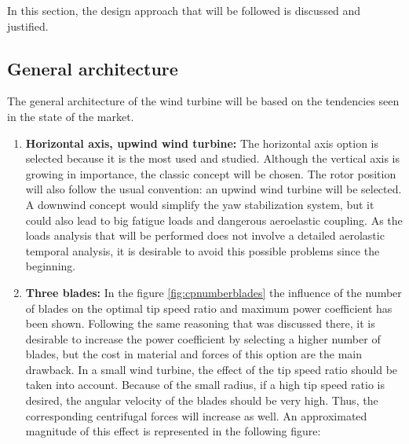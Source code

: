 \documentclass[../TFG_Report.tex]{subfiles}
\begin{document}
	
	In this section, the design approach that will be followed is discussed and justified. 

\subsection{General architecture}

The general architecture of the wind turbine will be based on the tendencies seen in the state of the market. \\

\begin{enumerate}


\item \textbf{Horizontal axis, upwind wind turbine:} The horizontal axis option is selected because it is the most used and studied. Although the vertical axis is growing in importance, the classic concept will be chosen. The rotor position will also follow the usual convention: an upwind wind turbine will be selected. A downwind concept would simplify the yaw stabilization system, but it could also lead to big fatigue loads and dangerous aeroelastic coupling. As the loads analysis that will be performed does not involve a detailed aerolastic temporal analysis, it is desirable to avoid this possible problems since the beginning. \\

\item  \textbf{Three blades:} In the figure \ref{fig:cpnumberblades} the influence of the number of blades on the optimal tip speed ratio and maximum power coefficient has been shown. Following the same reasoning that was discussed there, it is desirable to increase the power coefficient by selecting a higher number of blades, but the cost in material and forces of this option are the main drawback. In a small wind turbine, the effect of the tip speed ratio should be taken into account. Because of the small radius, if a high tip speed ratio is desired, the angular velocity of the blades should be very high. Thus, the corresponding centrifugal forces will increase as well. An approximated magnitude of this effect is represented in the following figure:


\end{enumerate}
\end{document}
